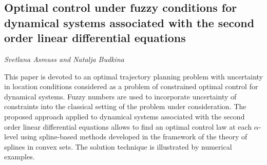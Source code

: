 \documentclass[../booklet.tex]{subfiles}
\begin{document}
\subsection[Optimal control under fuzzy conditions for dynamical systems associated with the second order linear differential equations. {\it Svetlana Asmuss and Natalja Budkina}]{Optimal control under fuzzy conditions for dynamical systems associated with the second order linear differential equations}
 

\begin{center}
  {\it Svetlana Asmuss and Natalja Budkina}
\end{center}



This paper is devoted to an optimal trajectory planning problem with uncertainty in location conditions considered as a problem of constrained optimal control for dynamical systems. Fuzzy numbers are used to incorporate uncertainty of constraints into the classical setting of the problem under consideration. The proposed approach applied to dynamical systems associated with the second order linear differential equations allows to find an optimal control law at each $\alpha$-level using spline-based methods developed in the framework of the theory of splines in convex sets. The solution technique is illustrated by numerical examples. 

\end{document}
